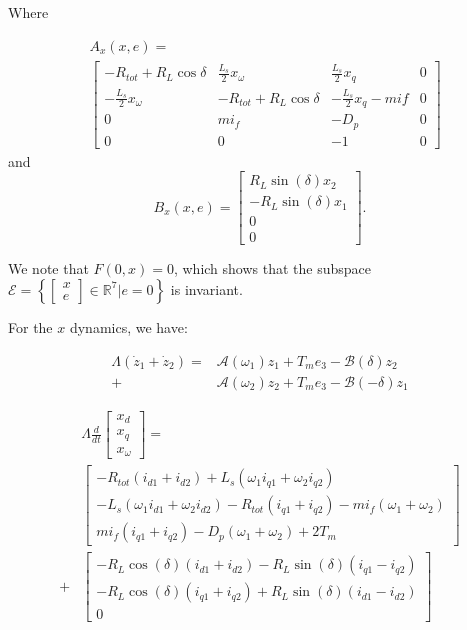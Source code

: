 \documentclass[letterpaper, 10 pt, conference]{ieeeconf}  %
\begin{document}
Where 

$$
\begin{aligned}
&A_x\left(x,e\right)  = \\ & \left[\begin{array}{cccc}
-R_{tot}+R_{L}\cos\delta & \frac{L_{s}}{2}x_{\omega} & \frac{L_{s}}{2}x_{q} & 0\\
-\frac{L_{s}}{2}x_{\omega} & -R_{tot}+R_{L}\cos\delta & -\frac{L_{s}}{2}x_{q}-mif & 0\\
0 & mi_{f} & -D_{p} & 0\\
0 & 0 & -1 & 0
\end{array}\right]
\end{aligned}
$$ 
and
$$
B_x\left(x,e\right) = 
\left[\begin{array}{c}
R_{L}\sin(\delta)x_{2}\\
-R_{L}\sin(\delta)x_{1}\\
0\\
0
\end{array}\right].
$$



We note that $F(0,x)=0$, which shows that the subspace
$\mathscr{E}=\left\{ \left[\begin{array}{c}
x\\
e
\end{array}\right]\in\mathbb{R}^{7}|e=0\right\} $ is invariant.

For the $x$ dynamics, we have:

$$
\begin{aligned}
\Lambda(\dot{z}_{1}+\dot{z}_{2})= & \mathcal{A}(\omega_{1})z_{1}+T_{m}e_{3}-\mathcal{B}(\delta)z_{2}\\+&\mathcal{A}(\omega_{2})z_{2}  +T_{m}e_{3}-\mathcal{B}(-\delta)z_{1}
\end{aligned}
$$

$$
\begin{aligned}
&\Lambda\frac{d}{dt}\left[\begin{array}{c}
x_{d}\\
x_{q}\\
x_{\omega}
\end{array}\right]  = \\
 & \left[\begin{array}{c}
-R_{tot}(i_{d1}+i_{d2})+L_{s}(\omega_{1}i_{q1}+\omega_{2}i_{q2})\\
-L_{s}(\omega_{1}i_{d1}+\omega_{2}i_{d2})-R_{tot}(i_{q1}+i_{q2})-mi_{f}(\omega_{1}+\omega_{2})\\
mi_{f}(i_{q1}+i_{q2})-D_{p}(\omega_{1}+\omega_{2})+2T_{m}
\end{array}\right]\\
 +& \left[\begin{array}{c}
-R_{L}\cos(\delta)(i_{d1}+i_{d2})-R_{L}\sin(\delta)(i_{q1}-i_{q2})\\
-R_{L}\cos(\delta)(i_{q1}+i_{q2})+R_{L}\sin(\delta)(i_{d1}-i_{d2})\\
0
\end{array}\right]
\end{aligned}
$$
\end{document}

